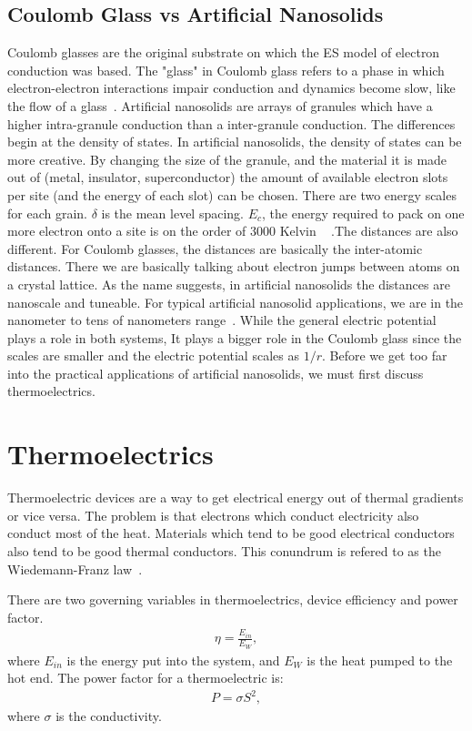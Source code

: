 \subsection{Coulomb Glass vs Artificial Nanosolids}
Coulomb glasses are the original substrate on which the ES model of electron conduction was based. The "glass" in Coulomb glass refers to a phase in which electron-electron interactions impair conduction and dynamics become slow, like the flow of a glass~\cite{ortuno04}. Artificial nanosolids are arrays of granules which have a higher intra-granule conduction than a inter-granule conduction. The differences begin at the density of states. In artificial nanosolids, the density of states can be more creative. By changing the size of the granule, and the material it is made out of (metal, insulator, superconductor) the amount of available electron slots per site (and the energy of each slot) can be chosen. There are two energy scales for each grain. $\delta$ is the mean level spacing. $E_c$, the energy required to pack on one more electron onto a site is on the order of 3000 Kelvin ~\cite{glatz08} .The distances are also different. For Coulomb glasses, the distances are basically the inter-atomic distances. There we are basically talking about electron jumps between atoms on a crystal lattice. As the name suggests, in artificial nanosolids the distances are nanoscale and tuneable. For typical artificial nanosolid applications, we are in the nanometer to tens of nanometers range~\cite{beloborodov05}. While the general electric potential plays a role in both systems, It plays a bigger role in the Coulomb glass since the scales are smaller and the electric potential scales as $1/r$. Before we get too far into the practical applications of artificial nanosolids, we must first discuss thermoelectrics.


\section{Thermoelectrics}
Thermoelectric devices are a way to get electrical energy out of thermal gradients or vice versa. The problem is that electrons which conduct electricity also conduct most of the heat. Materials which tend to be good electrical conductors also tend to be good thermal conductors. This conundrum is refered to as the Wiedemann-Franz law~\cite{glatz09}. 

	There are two governing variables in thermoelectrics, device efficiency and power factor. 
\begin{eqnarray}
\eta = \frac{E_{in}}{E_{W}},
\label{efficiency}
\end{eqnarray}
where $E_{in}$ is the energy put into the system, and $E_{W}$ is the heat pumped to the hot end. The power factor for a thermoelectric is:
\begin{eqnarray}
P = \sigma S^2,
\label{power}
\end{eqnarray}
where $\sigma$ is the conductivity.

